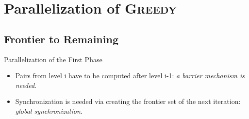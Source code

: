 \documentclass{beamer}
\begin{document}
%
%
%
%	
%	

\section{Parallelization of \textsc{Greedy}}
\subsection{Frontier to Remaining}

\begin{frame}{Parallelization of the First Phase}
	\begin{itemize}
		\item Pairs from level i have to be computed after  level i-1: \emph{a barrier mechanism is needed}.
		\item Synchronization is needed via creating the frontier set of the next iteration: \emph{global synchronization}.
	\end{itemize}
\end{frame}
\end{document}
